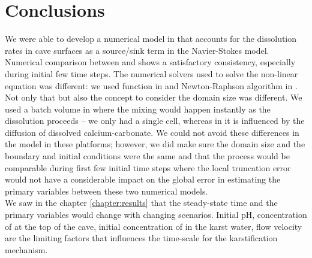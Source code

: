 \chapter{Conclusions}
\thispagestyle{empty}
We were able to develop a numerical model in \DuMuX that accounts for the dissolution rates in cave surfaces as a source/sink term in the Navier-Stokes model. \\


Numerical comparison between \DuMuX and \MATLAB shows a satisfactory consistency, especially during initial few time steps. The numerical solvers used to solve the non-linear equation was different: we used  function in \MATLAB and Newton-Raphson algorithm in \DuMuX. Not only that but also the concept to consider the domain size was different. We used a batch volume in \MATLAB where the mixing would happen instantly as the dissolution proceeds -- we only had a single cell, whereas in \DuMuX it is influenced by the diffusion of dissolved calcium-carbonate. We could not avoid these differences in the model in these platforms; however, we did make sure the domain size and the boundary and initial conditions were the same and that the process would be comparable during first few initial time steps where the local truncation error would not have a considerable impact on the global error in estimating the primary variables between these two numerical models.\\

We saw in the chapter \ref{chapter:results} that the steady-state time and the primary variables would change with changing scenarios. Initial pH, concentration of  at the top of the cave, initial concentration of  in the karst water, flow velocity are the limiting factors that influences the time-scale for the karstification mechanism.\\

